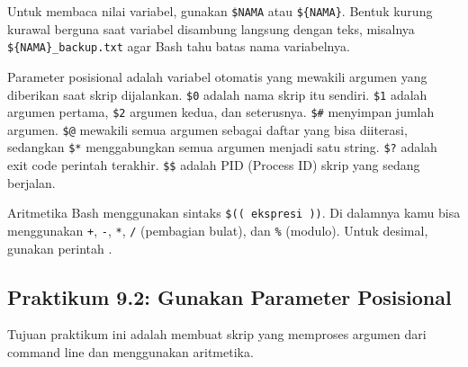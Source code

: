 Untuk membaca nilai variabel, gunakan \texttt{\$NAMA} atau
\texttt{\$\{NAMA\}}. Bentuk kurung kurawal berguna saat variabel disambung
langsung dengan teks, misalnya \texttt{\$\{NAMA\}\_backup.txt} agar Bash
tahu batas nama variabelnya.

Parameter posisional adalah variabel otomatis yang mewakili argumen
yang diberikan saat skrip dijalankan. \texttt{\$0} adalah nama skrip
itu sendiri. \texttt{\$1} adalah argumen pertama, \texttt{\$2} argumen
kedua, dan seterusnya. \texttt{\$\#} menyimpan jumlah argumen.
\texttt{\$@} mewakili semua argumen sebagai daftar yang bisa diiterasi,
sedangkan \texttt{\$*} menggabungkan semua argumen menjadi satu string.
\texttt{\$?} adalah exit code perintah terakhir. \texttt{\$\$} adalah
PID (Process ID) skrip yang sedang berjalan.

Aritmetika Bash menggunakan sintaks \texttt{\$(( ekspresi ))}. Di
dalamnya kamu bisa menggunakan \texttt{+}, \texttt{-}, \texttt{*},
\texttt{/} (pembagian bulat), dan \texttt{\%} (modulo). Untuk desimal,
gunakan perintah .

\subsection*{Praktikum 9.2: Gunakan Parameter Posisional}

Tujuan praktikum ini adalah membuat skrip yang memproses argumen dari
command line dan menggunakan aritmetika.

